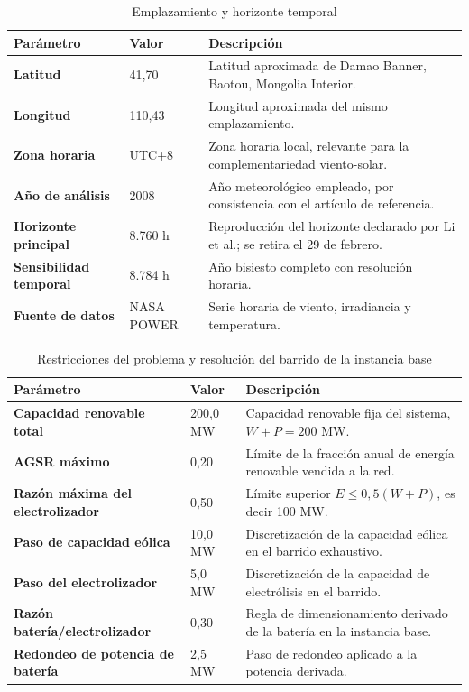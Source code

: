 \begingroup
\setlength{\tabcolsep}{3pt}
\renewcommand{\arraystretch}{1.15}
\footnotesize

\begin{table}[H]
\centering
\caption{Emplazamiento y horizonte temporal}
\label{tab:parametros_configuracion_replica}
\begin{tabular}{p{4.2cm} p{3.0cm} p{8.1cm}}
\hline
\textbf{Parámetro} & \textbf{Valor} & \textbf{Descripción} \\
\hline
\textbf{Latitud} & 41,70 & Latitud aproximada de Damao Banner, Baotou, Mongolia Interior. \\
\textbf{Longitud} & 110,43 & Longitud aproximada del mismo emplazamiento. \\
\textbf{Zona horaria} & UTC+8 & Zona horaria local, relevante para la complementariedad viento-solar. \\
\textbf{Año de análisis} & 2008 & Año meteorológico empleado, por consistencia con el artículo de referencia. \\
\textbf{Horizonte principal} & 8.760 h & Reproducción del horizonte declarado por Li et al.; se retira el 29 de febrero. \\
\textbf{Sensibilidad temporal} & 8.784 h & Año bisiesto completo con resolución horaria. \\
\textbf{Fuente de datos} & NASA POWER & Serie horaria de viento, irradiancia y temperatura. \\
\hline
\end{tabular}
\end{table}

\begin{table}[H]
\centering
\caption{Restricciones del problema y resolución del barrido de la instancia base}
\label{tab:parametros_busqueda_replica}
\begin{tabular}{p{4.2cm} p{3.0cm} p{8.1cm}}
\hline
\textbf{Parámetro} & \textbf{Valor} & \textbf{Descripción} \\
\hline
\textbf{Capacidad renovable total} & 200,0 MW & Capacidad renovable fija del sistema, $W+P=200$ MW. \\
\textbf{AGSR máximo} & 0,20 & Límite de la fracción anual de energía renovable vendida a la red. \\
\textbf{Razón máxima del electrolizador} & 0,50 & Límite superior $E \leq 0{,}5(W+P)$, es decir 100 MW. \\
\textbf{Paso de capacidad eólica} & 10,0 MW & Discretización de la capacidad eólica en el barrido exhaustivo. \\
\textbf{Paso del electrolizador} & 5,0 MW & Discretización de la capacidad de electrólisis en el barrido. \\
\textbf{Razón batería/electrolizador} & 0,30 & Regla de dimensionamiento derivado de la batería en la instancia base. \\
\textbf{Redondeo de potencia de batería} & 2,5 MW & Paso de redondeo aplicado a la potencia derivada. \\
\hline
\end{tabular}
\end{table}

